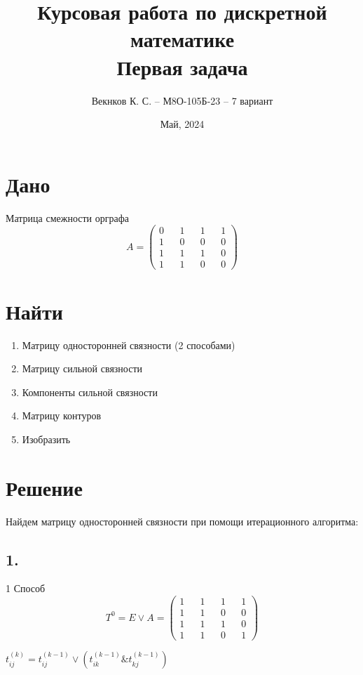 \documentclass{article}
\title{Курсовая работа по дискретной математике\\Первая задача}
\author{Векнков К. С. -- М8О-105Б-23 -- 7 вариант}
\date{Май, 2024}
\begin{document}
\maketitle
\section*{Дано}
Матрица смежности орграфа
$$
A =
\begin{pmatrix}
  0 && 1 && 1 && 1 \\
  1 && 0 && 0 && 0 \\
  1 && 1 && 1 && 0 \\
  1 && 1 && 0 && 0
\end{pmatrix}
$$

\section*{Найти}
\begin{enumerate}
\item Матрицу односторонней связности (2 способами)
\item Матрицу сильной связности
\item Компоненты сильной связности 
\item Матрицу контуров
\item Изобразить
\end{enumerate}

\section*{Решение}
Найдем матрицу односторонней связности при помощи итерационного алгоритма:

\subsection*{1.}

1 Способ 
$$
  T^{0} = E \lor A =
  \begin{pmatrix}
  1 && 1 && 1 && 1 \\
  1 && 1 && 0 && 0 \\
  1 && 1 && 1 && 0 \\
  1 && 1 && 0 && 1
  \end{pmatrix}
$$

$
t^{(k)}_{ij} = t^{(k-1)}_{ij} \lor (t^{(k-1)}_{ik} \& t^{(k-1)}_{kj})
$
\end{document}
